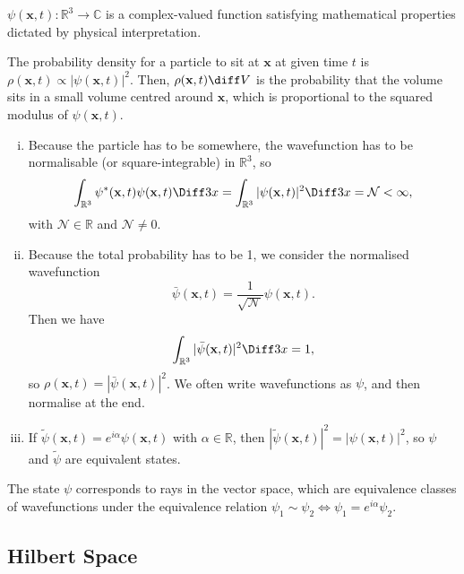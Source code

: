 \documentclass[12pt]{article}
\begin{document}
\begin{definition}
	$\psi(\mathbf{x}, t) : \mathbb{R}^3 \to \mathbb{C}$ is a complex-valued function satisfying mathematical properties dictated by physical interpretation.
\end{definition}

\begin{proposition}
	The probability density for a particle to sit at $\mathbf{x}$ at given time $t$ is $\rho(\mathbf{x}, t) \propto |\psi(\mathbf{x}, t)|^2$. Then, $\rho(\mathbf{x}, t)\diff V$ is the probability that the volume sits in a small volume centred around $\mathbf{x}$, which is proportional to the squared modulus of $\psi(\mathbf{x}, t)$.
\end{proposition}

\begin{enumerate}[(i)]
	\item Because the particle has to be somewhere, the wavefunction has to be normalisable (or square-integrable) in $\mathbb{R}^3$, so
		\[
			\int_{\mathbb{R}^3} \psi^{\ast}(\mathbf{x}, t) \psi(\mathbf{x}, t)\Diff3 x = \int_{\mathbb{R}^3} |\psi(\mathbf{x}, t)|^2\Diff3 x = \mathcal{N} < \infty
		,\]
		with $\mathcal{N} \in \mathbb{R}$ and $\mathcal{N} \neq 0$.
	\item Because the total probability has to be 1, we consider the normalised wavefunction
		\[
			\bar \psi(\mathbf{x}, t) = \frac{1}{\sqrt{\mathcal{N}}} \psi(\mathbf{x}, t)
		.\]
		Then we have
		\[
			\int_{\mathbb{R}^3}|\bar \psi (\mathbf{x}, t)|^2\Diff3 x = 1
		,\]
		so $\rho(\mathbf{x}, t) = |\bar \psi(\mathbf{x}, t)|^2$. We often write wavefunctions as $\psi$, and then normalise at the end.
	\item If $\tilde \psi (\mathbf{x}, t) = e^{i\alpha} \psi (\mathbf{x}, t)$ with $\alpha \in \mathbb{R}$, then $|\tilde \psi(\mathbf{x}, t)|^2 = |\psi(\mathbf{x}, t)|^2$, so $\psi$ and $\tilde \psi$ are equivalent states.
\end{enumerate}

The state $\psi$ corresponds to rays in the vector space, which are equivalence classes of wavefunctions under the equivalence relation $\psi_1 \sim \psi_2 \iff \psi_1 = e^{i \alpha}\psi_2$.

\subsection{Hilbert Space}%
\label{sub:hilbert_space}
\end{document}
